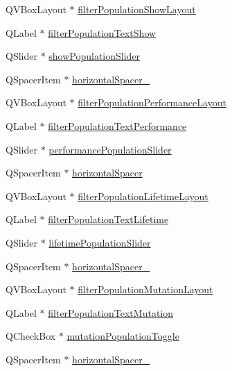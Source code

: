 \begin{DoxyCompactItemize}
\item 
Q\+V\+Box\+Layout $\ast$ \hyperlink{class_ui___g_a___viz_ac9fbceffe5a00ca6bf127a2d888c4b5f}{filter\+Population\+Show\+Layout}
\item 
Q\+Label $\ast$ \hyperlink{class_ui___g_a___viz_ab733e86e6e1f04629fb5d7cfd0143691}{filter\+Population\+Text\+Show}
\item 
Q\+Slider $\ast$ \hyperlink{class_ui___g_a___viz_ae76dc351d2d7925006a51cb82dddfc78}{show\+Population\+Slider}
\item 
Q\+Spacer\+Item $\ast$ \hyperlink{class_ui___g_a___viz_a49653e5dc87c4fa5c0442ada283b7a60}{horizontal\+Spacer\+\_}
\item 
Q\+V\+Box\+Layout $\ast$ \hyperlink{class_ui___g_a___viz_ab8bc350694df007b6c32c45a3fcdc14d}{filter\+Population\+Performance\+Layout}
\item 
Q\+Label $\ast$ \hyperlink{class_ui___g_a___viz_a564b07a9e51fee9ef8959436509a9bc7}{filter\+Population\+Text\+Performance}
\item 
Q\+Slider $\ast$ \hyperlink{class_ui___g_a___viz_ab074ddaab151754ef3d2c6dd3a56a90d}{performance\+Population\+Slider}
\item 
Q\+Spacer\+Item $\ast$ \hyperlink{class_ui___g_a___viz_a9dd875a311dbfad852db421981f5218a}{horizontal\+Spacer}
\item 
Q\+V\+Box\+Layout $\ast$ \hyperlink{class_ui___g_a___viz_aed15c85eb64b50f519c0fb8bbd66399a}{filter\+Population\+Lifetime\+Layout}
\item 
Q\+Label $\ast$ \hyperlink{class_ui___g_a___viz_a22a5174ded613cfd54dd49205cebb541}{filter\+Population\+Text\+Lifetime}
\item 
Q\+Slider $\ast$ \hyperlink{class_ui___g_a___viz_af4ba300ee11b9187c5614db4e199c074}{lifetime\+Population\+Slider}
\item 
Q\+Spacer\+Item $\ast$ \hyperlink{class_ui___g_a___viz_a0bbc764c0411b91defb16cca2bf2b53f}{horizontal\+Spacer\+\_}
\item 
Q\+V\+Box\+Layout $\ast$ \hyperlink{class_ui___g_a___viz_a42bcab75208e2e079390971736698322}{filter\+Population\+Mutation\+Layout}
\item 
Q\+Label $\ast$ \hyperlink{class_ui___g_a___viz_aef6b033660a7b44af5054dd0de50c902}{filter\+Population\+Text\+Mutation}
\item 
Q\+Check\+Box $\ast$ \hyperlink{class_ui___g_a___viz_aea8e8c28e0ef13b25e1d9091e9b243ef}{mutation\+Population\+Toggle}
\item 
Q\+Spacer\+Item $\ast$ \hyperlink{class_ui___g_a___viz_a326250a37cbde96b8f6db24e5232ba33}{horizontal\+Spacer\+\_}

\end{DoxyCompactItemize}
